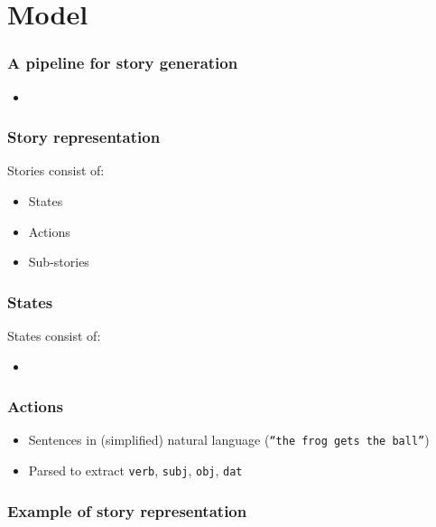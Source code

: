 \section{Model}

\begin{frame}
	\frametitle{A pipeline for story generation}
	\begin{itemize}
		\item
	\end{itemize}
\end{frame}

\begin{frame}
	\frametitle{Story representation}
	Stories consist of:
	\begin{itemize}
		\item States
		\item Actions
		\item Sub-stories
	\end{itemize}
\end{frame}

\begin{frame}
	\frametitle{States}
	States consist of:
	\begin{itemize}
		\item 
	\end{itemize}
\end{frame}

\begin{frame}
	\frametitle{Actions}
	\begin{itemize}
		\item Sentences in (simplified) natural language (\texttt{``the frog
		gets the ball''})
		\item Parsed to extract \texttt{verb}, \texttt{subj}, \texttt{obj},
		\texttt{dat}
	\end{itemize}
\end{frame}

\begin{frame}
	\frametitle{Example of story representation}
\end{frame}
